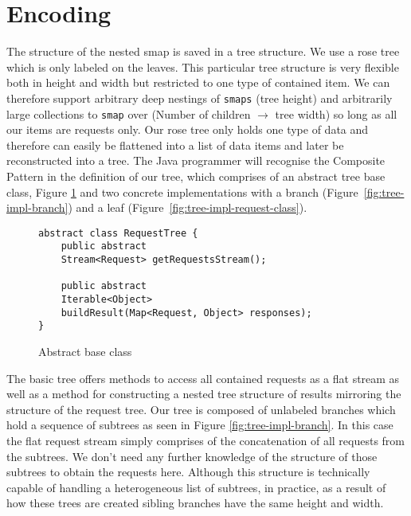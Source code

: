 \section{Encoding}

The structure of the nested smap is saved in a tree structure.
We use a rose tree\cite{MALCOLM1990255} which is only labeled on the leaves.
This particular tree structure is very flexible both in height and width but restricted to one type of contained item.
We can therefore support arbitrary deep nestings of \texttt{smaps} (tree height) and arbitrarily large collections to \texttt{smap} over (Number of children $\rightarrow$ tree width) so long as all our items are requests only.
Our rose tree only holds one type of data and therefore can easily be flattened into a list of data items and later be reconstructed into a tree.
The Java programmer will recognise the Composite Pattern\cite{gamma1995design} in the definition of our tree, which comprises of an abstract tree base class, Figure \ref{fig:tree-impl-base-class} and two concrete implementations with a branch (Figure~\ref{fig:tree-impl-branch}) and a leaf (Figure~\ref{fig:tree-impl-request-class}).

\begin{figure}[h]

\begin{verbatim}
abstract class RequestTree {
    public abstract
    Stream<Request> getRequestsStream();

    public abstract
    Iterable<Object>
    buildResult(Map<Request, Object> responses);
}
\end{verbatim}
\caption{Abstract base class}
\label{fig:tree-impl-base-class}

\end{figure}

The basic tree offers methods to access all contained requests as a flat stream as well as a method for constructing a nested tree structure of results mirroring the structure of the request tree.
Our tree is composed of unlabeled branches which hold a sequence of subtrees as seen in Figure \ref{fig:tree-impl-branch}.
In this case the flat request stream simply comprises of the concatenation of all requests from the subtrees.
We don't need any further knowledge of the structure of those subtrees to obtain the requests here.
Although this structure is technically capable of handling a heterogeneous list of subtrees, in practice, as a result of how these trees are created sibling branches have the same height and width.

